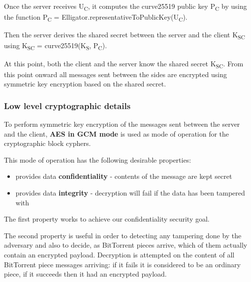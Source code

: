 \documentclass[11pt]{article} %
\begin{document}

Once the server receives U\textsubscript{C}, it computes the curve25519 public key P\textsubscript{C} by using the function P\textsubscript{C} = Elligator.representativeToPublicKey(U\textsubscript{C}).

Then the server derives the shared secret between the server and the client K\textsubscript{SC} using K\textsubscript{SC} = curve25519(K\textsubscript{S}, P\textsubscript{C}).

At this point, both the client and the server know the shared secret K\textsubscript{SC}. From this point onward all messages sent between the sides are encrypted using symmetric key encryption based on the shared secret.


\subsubsection{Low level cryptographic details}

To perform symmetric key encryption of the messages sent between the server and the client, \textbf{AES in GCM mode} is used as mode of operation for the cryptographic block cyphers.

This mode of operation has the following desirable properties:
\begin{itemize}
\item provides data \textbf{confidentiality} - contents of the message are kept secret
\item provides data \textbf{integrity} - decryption will fail if the data has been tampered with
\end{itemize}

The first property works to achieve our confidentiality security goal.

The second property is useful in order to detecting any tampering done by the adversary and also to decide, as BitTorrent pieces arrive, which of them actually contain an encrypted payload. Decryption is attempted on the content of all BitTorrent piece messages arriving: if it fails it is considered to be an ordinary piece, if it succeeds then it had an encrypted payload.

\label{subsec:cryptoProtocol}

\end{document}
